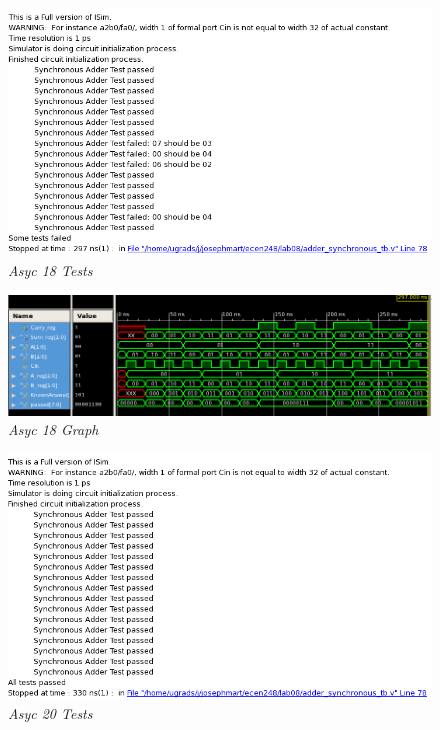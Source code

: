 \documentclass[a4paper,12pt]{article}
\begin{document}
  \begin{figure}[h]
    \begin{center}
      \includegraphics[scale=0.35]{asyc_18_tests.png}
      \caption{\textit{Asyc 18 Tests}}
    \end{center}
  \end{figure}
  
  \newpage
  
  \begin{figure}[h]
    \begin{center}
      \includegraphics[scale=0.4]{asyc_18_graph.png}
      \caption{\textit{Asyc 18 Graph}}
    \end{center}
  \end{figure}
  
  \begin{figure}[h]
    \begin{center}
      \includegraphics[scale=0.5]{asyc_20_tests.png}
      \caption{\textit{Asyc 20 Tests}}
    \end{center}
  \end{figure}
  
\end{document}
